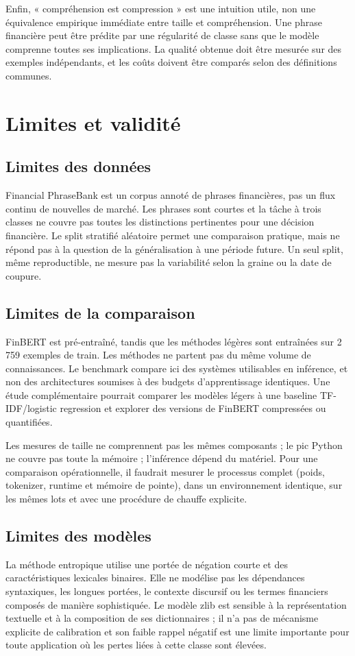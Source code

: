 \documentclass[11pt,a4paper]{article}
\begin{document}
Enfin, « compréhension est compression » est une intuition utile, non une
équivalence empirique immédiate entre taille et compréhension. Une phrase
financière peut être prédite par une régularité de classe sans que le modèle
comprenne toutes ses implications. La qualité obtenue doit être mesurée sur
des exemples indépendants, et les coûts doivent être comparés selon des
définitions communes.

\section{Limites et validité}

\subsection{Limites des données}
Financial PhraseBank est un corpus annoté de phrases financières, pas un flux
continu de nouvelles de marché. Les phrases sont courtes et la tâche à trois
classes ne couvre pas toutes les distinctions pertinentes pour une décision
financière. Le split stratifié aléatoire permet une comparaison pratique,
mais ne répond pas à la question de la généralisation à une période future.
Un seul split, même reproductible, ne mesure pas la variabilité selon la
graine ou la date de coupure.

\subsection{Limites de la comparaison}
FinBERT est pré-entraîné, tandis que les méthodes légères sont entraînées sur
2\,759 exemples de train. Les méthodes ne partent pas du même volume de
connaissances. Le benchmark compare ici des systèmes utilisables en
inférence, et non des architectures soumises à des budgets d'apprentissage
identiques. Une étude complémentaire pourrait comparer les modèles légers à
une baseline TF-IDF/logistic regression et explorer des versions de FinBERT
compressées ou quantifiées.

Les mesures de taille ne comprennent pas les mêmes composants ; le pic
Python ne couvre pas toute la mémoire ; l'inférence dépend du matériel. Pour
une comparaison opérationnelle, il faudrait mesurer le processus complet
(poids, tokenizer, runtime et mémoire de pointe), dans un environnement
identique, sur les mêmes lots et avec une procédure de chauffe explicite.

\subsection{Limites des modèles}
La méthode entropique utilise une portée de négation courte et des
caractéristiques lexicales binaires. Elle ne modélise pas les dépendances
syntaxiques, les longues portées, le contexte discursif ou les termes
financiers composés de manière sophistiquée. Le modèle zlib est sensible à la
représentation textuelle et à la composition de ses dictionnaires ; il n'a pas
de mécanisme explicite de calibration et son faible rappel négatif est une
limite importante pour toute application où les pertes liées à cette classe
sont élevées.
\end{document}
